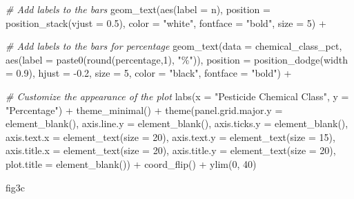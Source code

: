 \documentclass[
]{article}
\newenvironment{Shaded}{\begin{snugshade}}{\end{snugshade}}
\newcommand{\AttributeTok}[1]{\textcolor[rgb]{0.77,0.63,0.00}{#1}}
\newcommand{\CommentTok}[1]{\textcolor[rgb]{0.56,0.35,0.01}{\textit{#1}}}
\newcommand{\DecValTok}[1]{\textcolor[rgb]{0.00,0.00,0.81}{#1}}
\newcommand{\FloatTok}[1]{\textcolor[rgb]{0.00,0.00,0.81}{#1}}
\newcommand{\FunctionTok}[1]{\textcolor[rgb]{0.00,0.00,0.00}{#1}}
\newcommand{\NormalTok}[1]{#1}
\newcommand{\SpecialCharTok}[1]{\textcolor[rgb]{0.00,0.00,0.00}{#1}}
\newcommand{\StringTok}[1]{\textcolor[rgb]{0.31,0.60,0.02}{#1}}
\begin{document}
\begin{Shaded}
\begin{Highlighting}[]
  \CommentTok{\# Add labels to the bars}
  \FunctionTok{geom\_text}\NormalTok{(}\FunctionTok{aes}\NormalTok{(}\AttributeTok{label =}\NormalTok{ n), }\AttributeTok{position =} \FunctionTok{position\_stack}\NormalTok{(}\AttributeTok{vjust =} \FloatTok{0.5}\NormalTok{), }\AttributeTok{color =} \StringTok{"white"}\NormalTok{, }\AttributeTok{fontface =} \StringTok{"bold"}\NormalTok{, }\AttributeTok{size =} \DecValTok{5}\NormalTok{) }\SpecialCharTok{+}
  
   
  \CommentTok{\# Add labels to the bars for percentage }
 \FunctionTok{geom\_text}\NormalTok{(}\AttributeTok{data =}\NormalTok{ chemical\_class\_pct, }\FunctionTok{aes}\NormalTok{(}\AttributeTok{label =} \FunctionTok{paste0}\NormalTok{(}\FunctionTok{round}\NormalTok{(percentage,}\DecValTok{1}\NormalTok{), }\StringTok{"\%"}\NormalTok{)), }
            \AttributeTok{position =} \FunctionTok{position\_dodge}\NormalTok{(}\AttributeTok{width =} \FloatTok{0.9}\NormalTok{), }\AttributeTok{hjust =} \SpecialCharTok{{-}}\FloatTok{0.2}\NormalTok{, }\AttributeTok{size =} \DecValTok{5}\NormalTok{, }\AttributeTok{color =} \StringTok{"black"}\NormalTok{, }\AttributeTok{fontface =} \StringTok{"bold"}\NormalTok{) }\SpecialCharTok{+}
   
  \CommentTok{\# Customize the appearance of the plot}
  \FunctionTok{labs}\NormalTok{(}\AttributeTok{x =} \StringTok{"Pesticide Chemical Class"}\NormalTok{, }\AttributeTok{y =} \StringTok{"Percentage"}\NormalTok{) }\SpecialCharTok{+}
  \FunctionTok{theme\_minimal}\NormalTok{() }\SpecialCharTok{+}
  \FunctionTok{theme}\NormalTok{(}\AttributeTok{panel.grid.major.y =} \FunctionTok{element\_blank}\NormalTok{(),}
    \AttributeTok{axis.line.y =} \FunctionTok{element\_blank}\NormalTok{(),}
    \AttributeTok{axis.ticks.y =} \FunctionTok{element\_blank}\NormalTok{(),}
    \AttributeTok{axis.text.x =} \FunctionTok{element\_text}\NormalTok{(}\AttributeTok{size =} \DecValTok{20}\NormalTok{),}
    \AttributeTok{axis.text.y =} \FunctionTok{element\_text}\NormalTok{(}\AttributeTok{size =} \DecValTok{15}\NormalTok{),}
    \AttributeTok{axis.title.x =} \FunctionTok{element\_text}\NormalTok{(}\AttributeTok{size =} \DecValTok{20}\NormalTok{),}
    \AttributeTok{axis.title.y =} \FunctionTok{element\_text}\NormalTok{(}\AttributeTok{size =} \DecValTok{20}\NormalTok{),}
    \AttributeTok{plot.title =} \FunctionTok{element\_blank}\NormalTok{()) }\SpecialCharTok{+}
    \FunctionTok{coord\_flip}\NormalTok{() }\SpecialCharTok{+}
    \FunctionTok{ylim}\NormalTok{(}\DecValTok{0}\NormalTok{, }\DecValTok{40}\NormalTok{)}
    

\NormalTok{ fig3c}
\end{Highlighting}
\end{Shaded}
\end{document}
